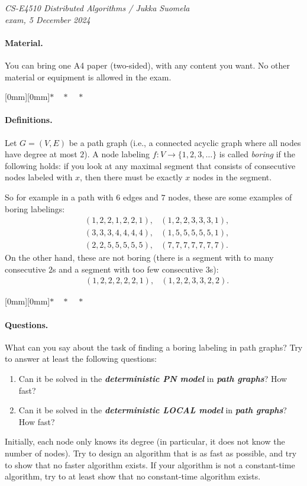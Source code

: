 \documentclass[12pt,a4paper]{article}
\newcommand{\sep}{{\centering \raisebox{-3mm}[0mm][0mm]{$*\quad*\quad*$}\par}}
\newcommand{\cemph}[1]{\textbf{\emph{\boldmath #1}}}
\begin{document}
\noindent
\emph{CS-E4510 Distributed Algorithms / Jukka Suomela\\
exam, 5 December 2024}

\paragraph{Material.}

You can bring one A4 paper (two-sided), with any content you want. No other material or equipment is allowed in the exam.

\sep

\paragraph{Definitions.}

Let $G = (V,E)$ be a path graph (i.e., a connected acyclic graph where all nodes have degree at most $2$).
A node labeling $f\colon V \to \{1,2,3,\dotsc\}$ is called \emph{boring} if the following holds: if you look at any maximal segment that consists of consecutive nodes labeled with $x$, then there must be exactly $x$ nodes in the segment.

So for example in a path with $6$ edges and $7$ nodes, these are some examples of boring labelings:
\begin{align*}
    &(1,2,2,1,2,2,1),
    &(1,2,2,3,3,3,1),\\
    &(3,3,3,4,4,4,4),
    &(1,5,5,5,5,5,1),\\
    &(2,2,5,5,5,5,5),
    &(7,7,7,7,7,7,7).
\end{align*}
On the other hand, these are not boring (there is a segment with to many consecutive $2$s and a segment with too few consecutive $3$s):
\begin{align*}
    &(1,2,2,2,2,2,1),
    &(1,2,2,3,3,2,2).
\end{align*}

\sep

\paragraph{Questions.}

What can you say about the task of finding a boring labeling in path graphs? Try to answer at least the following questions:
\begin{enumerate}[noitemsep]
    \item Can it be solved in the \cemph{deterministic PN model} in \cemph{path graphs}? How fast?
    \item Can it be solved in the \cemph{deterministic LOCAL model} in \cemph{path graphs}? How fast?
\end{enumerate}
Initially, each node only knows its degree (in particular, it does not know the number of nodes). Try to design an algorithm that is as fast as possible, and try to show that no faster algorithm exists. If your algorithm is not a constant-time algorithm, try to at least show that no constant-time algorithm exists.
\end{document}

